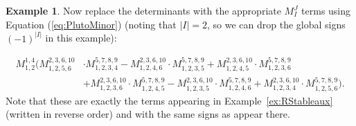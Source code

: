 \documentclass[10pt]{amsart}
\theoremstyle{definition}
\theoremstyle{plain}
\theoremstyle{plain}
\theoremstyle{definition}
\newtheorem{example}[cdrthm]{Example}
\theoremstyle{remark}
\theoremstyle{plain}
\theoremstyle{plain}
\theoremstyle{plain}
\numberwithin{equation}{section}
\begin{document}
\begin{example}
Now replace the determinants with the appropriate $M^J_I$ terms using Equation (\ref{eq:PlutoMinor}) (noting that $|I| = 2$, so we can drop the global signs $(-1)^{|I|}$ in this example):

\begin{align*}M_{1,2}^{1,4}\Bigg( M_{1,2,5,6}^{2,3,6,10} &\cdot M_{1,2,3,4}^{5,7,8,9}
-M_{1,2,4,6}^{2,3,6,10}\cdot M_{1,2,3,5}^{5,7,8,9}
+M_{1,2,4,5}^{2,3,6,10}\cdot M_{1,2,3,6}^{5,7,8,9}\\
&+M_{1,2,3,6}^{2,3,6,10}\cdot M_{1,2,4,5}^{5,7,8,9} -M_{1,2,3,5}^{2,3,6,10}\cdot M_{1,2,4,6}^{5,7,8,9}+M_{1,2,3,4}^{2,3,6,10}\cdot M_{1,2,5,6}^{5,7,8,9}\Bigg).\end{align*}
Note that these are exactly the terms appearing in Example~\ref{ex:RStableaux} (written in reverse order) and with the same signs as appear there.
\end{example}
\end{document}

